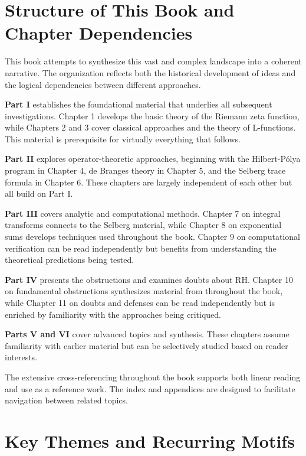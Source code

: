 \section*{Structure of This Book and Chapter Dependencies}

This book attempts to synthesize this vast and complex landscape into a coherent narrative. The organization reflects both the historical development of ideas and the logical dependencies between different approaches.

\textbf{Part I} establishes the foundational material that underlies all subsequent investigations. Chapter 1 develops the basic theory of the Riemann zeta function, while Chapters 2 and 3 cover classical approaches and the theory of L-functions. This material is prerequisite for virtually everything that follows.

\textbf{Part II} explores operator-theoretic approaches, beginning with the Hilbert-P\'olya program in Chapter 4, de Branges theory in Chapter 5, and the Selberg trace formula in Chapter 6. These chapters are largely independent of each other but all build on Part I.

\textbf{Part III} covers analytic and computational methods. Chapter 7 on integral transforms connects to the Selberg material, while Chapter 8 on exponential sums develops techniques used throughout the book. Chapter 9 on computational verification can be read independently but benefits from understanding the theoretical predictions being tested.

\textbf{Part IV} presents the obstructions and examines doubts about RH. Chapter 10 on fundamental obstructions synthesizes material from throughout the book, while Chapter 11 on doubts and defenses can be read independently but is enriched by familiarity with the approaches being critiqued.

\textbf{Parts V and VI} cover advanced topics and synthesis. These chapters assume familiarity with earlier material but can be selectively studied based on reader interests.

The extensive cross-referencing throughout the book supports both linear reading and use as a reference work. The index and appendices are designed to facilitate navigation between related topics.

\section*{Key Themes and Recurring Motifs}

